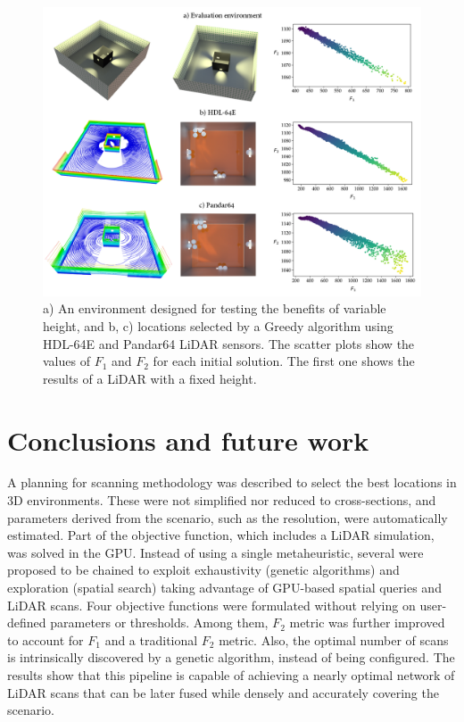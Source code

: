 \begin{figure}
    \centering
    \includegraphics[width=\linewidth]{figs/lidar_optimization/height_variability.png}
	\caption{a) An environment designed for testing the benefits of variable height, and b, c) locations selected by a Greedy algorithm using HDL-64E and Pandar64 LiDAR sensors. The scatter plots show the values of $F_1$ and $F_2$ for each initial solution. The first one shows the results of a LiDAR with a fixed height. }
	\label{fig:cubicle_room}
\end{figure}

\section{Conclusions and future work}

A planning for scanning methodology was described to select the best locations in 3D environments. These were not simplified nor reduced to cross-sections, and parameters derived from the scenario, such as the resolution, were automatically estimated. Part of the objective function, which includes a LiDAR simulation, was solved in the GPU. Instead of using a single metaheuristic, several were proposed to be chained to exploit exhaustivity (genetic algorithms) and exploration (spatial search) taking advantage of GPU-based spatial queries and LiDAR scans. Four objective functions were formulated without relying on user-defined parameters or thresholds. Among them, $F_2$ metric was further improved to account for $F_1$ and a traditional $F_2$ metric. Also, the optimal number of scans is intrinsically discovered by a genetic algorithm, instead of being configured. The results show that this pipeline is capable of achieving a nearly optimal network of LiDAR scans that can be later fused while densely and accurately covering the scenario. 

